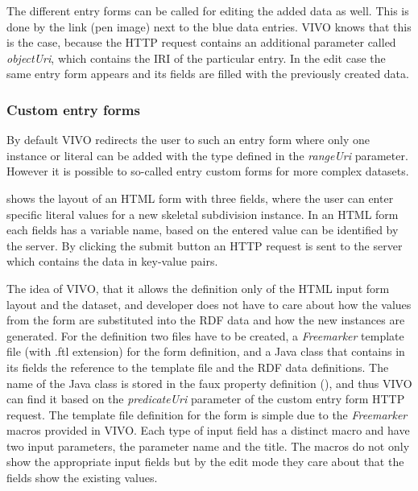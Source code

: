 The different entry forms can be called for editing the added data as well. This is done by the link (pen image) next to the blue data entries. VIVO knows that this is the case, because the HTTP request contains an additional parameter called \textit{objectUri}, which contains the IRI of the particular entry. In the edit case the same entry form appears and its fields are filled with the previously created data.

\subsubsection{Custom entry forms} \label{vivoCef}

By default VIVO redirects the user to such an entry form where only one instance or literal can be added with the type defined in the \textit{rangeUri} parameter. However it is possible to so-called entry custom forms for more complex datasets.


 shows the layout of an HTML form with three fields, where the user can enter specific literal values for a new skeletal subdivision instance. In an HTML form each fields has a variable name, based on the entered value can be identified by the server. By clicking the submit button an HTTP request is sent to the server which contains the data in key-value pairs.

The idea of VIVO, that it allows the definition only of the HTML input form layout and the dataset, and developer does not have to care about how the values from the form are substituted into the RDF data and how the new instances are generated. For the definition two files have to be created, a \textit{Freemarker}  template file (with .ftl extension) for the form definition, and a Java class that contains in its fields the reference to the template file and the RDF data definitions. The name of the Java class is stored in the faux property definition (), and thus VIVO can find it based on the \textit{predicateUri} parameter of the custom entry form HTTP request. The template file definition for the form is simple due to the \textit{Freemarker} macros provided in VIVO. Each type of input field has a distinct macro and have two input parameters, the parameter name and the title. The macros do not only show the appropriate input fields but by the edit mode they care about that the fields show the existing values.

